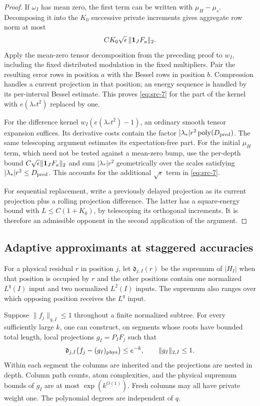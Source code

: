 \begin{proof}
If $\omega_I$ has mean zero, the first term can be written with
$\mu_H-\mu_s$.  Decomposing it into the $K_0$ successive private
increments gives aggregate row norm at most
\[
 C K_0\sqrt\epsilon\,\|\mathbf 1_JF_a\|_2.
\]
Apply the mean-zero tensor decomposition from the preceding proof
to $w_I$, including the fixed distributed modulation in the fixed
multipliers.  Pair the resulting error rows in position $a$ with
the Bessel rows in position $b$.  Compression handles a current
projection in that position; an energy sequence is handled by its
per-interval Bessel estimate.  This proves
\eqref{eq:src-7} for the part of the kernel with
$e(\lambda_*t^2)$ replaced by one.

For the difference kernel
$w_I(e(\lambda_*t^2)-1)$, an ordinary smooth tensor expansion suffices.
Its derivative costs contain the factor
$|\lambda_*|r^2\operatorname{poly}(D_{\rm pred})$.
The same telescoping argument estimates its expectation-free part.
For the initial $\mu_H$ term, which need not be tested against a
mean-zero bump, use the per-depth bound
$C\sqrt\epsilon\|\mathbf 1_JF_a\|_2$ and sum
$|\lambda_*|r^2$ geometrically over the scales satisfying
$|\lambda_*|r^2\le D_{\rm pred}$.  This accounts for the additional
$\sqrt\epsilon$ term in \eqref{eq:src-7}.

For sequential replacement, write a previously delayed projection
as its current projection plus a rolling projection difference.
The latter has a square-energy bound with $L\le C(1+K_0)$, by
telescoping its orthogonal increments.  It is therefore an admissible
opponent in the second application of the argument.
\end{proof}

\subsection{Adaptive approximants at staggered accuracies}

For a physical residual $r$ in position $j$, let
$\mathfrak d_{j,I}(r)$ be the supremum of $|H_I|$ when that position
is occupied by $r$ and the other positions contain one normalized
$L^q(I)$ input and two normalized $L^2(I)$ inputs.  The supremum
also ranges over which opposing position receives the $L^q$ input.

\begin{lemma}
\label{lem:adaptive-approximation}
Suppose $\|f_j\|_{q,I}\le1$ throughout a finite normalized subtree.
For every sufficiently large $k$, one can construct, on segments
whose roots have bounded total length, local projections $g_I=P_IF_j$
such that
\[
 \mathfrak d_{j,I}\bigl(f_j-(g_I)_{\mathrm{phys}}\bigr)\le e^{-k},
 \qquad \|g_I\|_{2,I}\le1.
\]
Within each segment the columns are inherited and the projections
are nested in depth.  Column path counts, atom complexities, and
the physical supremum bounds of $g_I$ are at most
$\exp(k^{O(1)})$.  Fresh columns may all have private weight one.
The polynomial degrees are independent of $q$.
\end{lemma}

